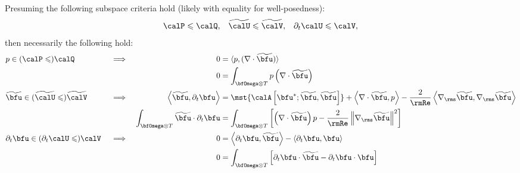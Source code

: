     \begin{remark}
    \end{remark}

    Presuming the following subspace criteria hold (likely with equality for well-posedness):
    \begin{align}
                    \calP  \leqslant  \calQ,  &&
        \widetilde{\calU}  \leqslant  \widetilde{\calV},  &&
        \partial_{t}\calU  \leqslant  \calV,
    \end{align}
    then necessarily the following hold:
    \begin{align}
        &p                 \in  (\calP              \leqslant)  \calQ              &&\implies  &                                                              0  &=  \langle p, (\nabla\cdot\widetilde{\bfu})\rangle  \\
        &                                                                          &&          &                                                              0  &=  \int_{\bfOmega\otimes T}p\left(\nabla\cdot\widetilde{\bfu}\right)  \\
        &\widetilde{\bfu}  \in  (\widetilde{\calU}  \leqslant)  \widetilde{\calV}  &&\implies  &    \left\langle\widetilde{\bfu}, \partial_{t}\bfu\right\rangle  &=  \mst{\calA\left[\bfu^{*}; \widetilde{\bfu}, \widetilde{\bfu}\right]} + \left\langle\nabla\cdot\widetilde{\bfu}, p\right\rangle - \frac{2}{\rmRe}\left\langle\nabla_{\rms}\widetilde{\bfu}, \nabla_{\rms}\widetilde{\bfu}\right\rangle  \\
        &                                                                          &&          &  \int_{\bfOmega\otimes T}\widetilde{\bfu}\cdot\partial_{t}\bfu  &=  \int_{\bfOmega\otimes T}\left[\left(\nabla\cdot\widetilde{\bfu}\right)p - \frac{2}{\rmRe}\left\|\nabla_{\rms}\widetilde{\bfu}\right\|^{2}\right]  \\
        &\partial_{t}\bfu  \in  (\partial_{t}\calU  \leqslant)  \calV              &&\implies  &                                                              0  &=  \left\langle\partial_{t}\bfu, \widetilde{\bfu}\right\rangle - \left\langle\partial_{t}\bfu, \bfu\right\rangle  \\
        &                                                                          &&          &                                                              0  &=  \int_{\bfOmega\otimes T}\left[\partial_{t}\bfu\cdot\widetilde{\bfu} - \partial_{t}\bfu\cdot\bfu\right]  \\
    \end{align}

